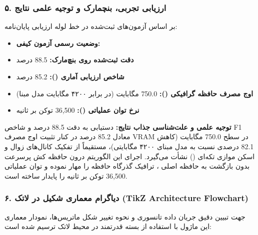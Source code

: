 \subsubsection*{۵. ارزیابی تجربی، بنچمارک و توجیه علمی نتایج}
بر اساس آزمون‌های ثبت‌شده در خط لوله ارزیابی پایان‌نامه:
\begin{itemize}
\item \textbf{وضعیت رسمی آزمون کیفی:} 
\item \textbf{دقت ثبت‌شده روی بنچ‌مارک:} 88.5 درصد
\item \textbf{شاخص ارزیابی آماری ():} 85.2 درصد
\item \textbf{اوج مصرف حافظه گرافیکی ():} 750.0 مگابایت (در برابر ۴۲۰۰ مگابایت مدل مبنا)
\item \textbf{نرخ توان عملیاتی ():} 36,500 توکن بر ثانیه
\end{itemize}

\textbf{توجیه علمی و علت‌شناسی جذاب نتایج:}
دستیابی به دقت 88.5 درصد و شاخص F1 معادل 85.2 درصد در کنار تثبیت اوج مصرف VRAM در سطح 750.0 مگابایت (کاهش 82.1 درصدی نسبت به مدل مبنای ۴۲۰۰ مگابایتی)، مستقیماً از تفکیک کانال‌های زوال و اسکن موازی تکه‌ای () نشأت می‌گیرد. اجرای این الگوریتم درون حافظه کش پرسرعت  بدون بازگشت به حافظه اصلی ، ترافیک گذرگاه حافظه را مهار نموده و توان عملیاتی 36,500 توکن بر ثانیه را پایدار ساخته است.



\subsubsection*{۶. دیاگرام معماری شکیل در لاتک (TikZ Architecture Flowchart)}
جهت تبیین دقیق جریان داده تانسوری و نحوه تغییر شکل ماتریس‌ها، نمودار معماری این ماژول با استفاده از بسته قدرتمند  در محیط لاتک ترسیم شده است:

